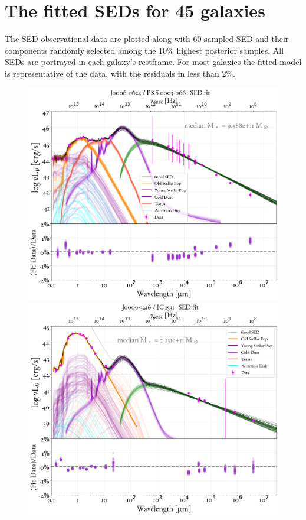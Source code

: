 \clearpage
\chapter{The fitted SEDs for 45 galaxies} \label{app:SEDFits}


The SED observational data are plotted along with 60 sampled SED and their components randomly selected among the 10\% highest posterior samples. All SEDs are portrayed in each galaxy's restframe. For most galaxies the fitted model is representative of the data, with the residuals in less than 2\%. 


\begin{figure}
    \centering
    \includegraphics[width=0.85\linewidth]{figures/ResultFits/0_SEDfit_10.png}\\
    \includegraphics[width=0.85\linewidth]{figures/ResultFits/1_SEDfit_16.png}   
\end{figure}

